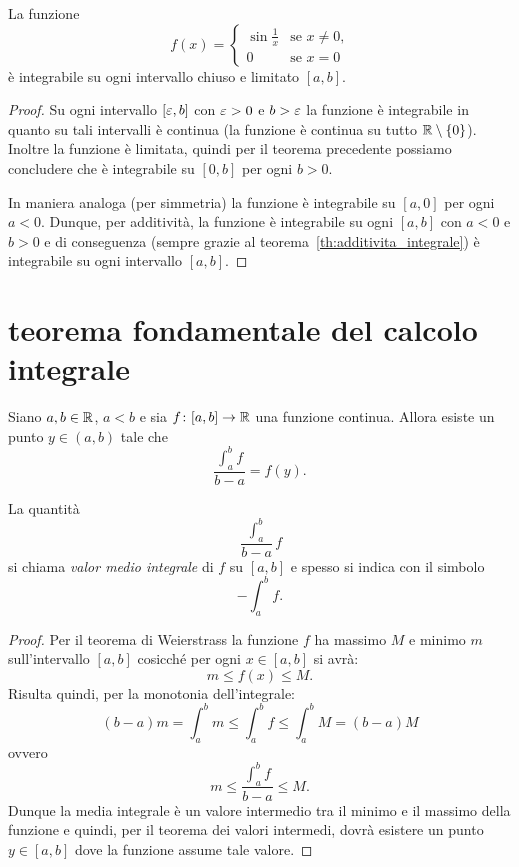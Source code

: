 \begin{example}
La funzione
\[
  f(x) = \begin{cases}
  \sin\frac 1 x & \text{se $x\neq 0$,}\\
  0 & \text{se $x=0$}
  \end{cases}
\]
è integrabile su ogni intervallo chiuso e limitato $[a,b]$.
\end{example}
\begin{proof}
Su ogni intervallo $[\varepsilon,b]$ con $\varepsilon>0$ e $b>\varepsilon$ la funzione
è integrabile in quanto su tali intervalli è continua (la funzione è continua su
tutto $\mathbb R\setminus{\left\{ 0 \right\}}$). Inoltre la funzione è limitata, quindi per il teorema
precedente possiamo concludere che è integrabile su $[0,b]$ per ogni $b>0$.

In maniera analoga (per simmetria) la funzione è integrabile su $[a,0]$
per ogni $a<0$.
Dunque, per additività, la funzione è integrabile su ogni $[a,b]$ con $a<0$ e $b>0$
e di conseguenza (sempre grazie al teorema~\ref{th:additivita_integrale})
è integrabile su ogni intervallo $[a,b]$.
\end{proof}

\section{teorema fondamentale del calcolo integrale}

\begin{theorem}
\mymark{***}
Siano $a,b\in \mathbb R$, $a<b$ e sia
$f\colon [a,b] \to \mathbb R$ una funzione continua.
Allora esiste un punto $y \in (a,b)$
tale che
\[
\frac{\int_a^b f}{b-a} = f(y).
\]
\end{theorem}
%
La quantità
\[
  \frac{\int_a^b}{b-a} f
\]
si chiama \emph{valor medio integrale} di $f$ su $[a,b]$ e spesso
si indica con il simbolo
\[
  -\!\!\!\!\!\!\int_a^b f.
\]
%
\begin{proof}
\mymark{***}
Per il teorema di Weierstrass la funzione $f$ ha massimo $M$ e minimo $m$
sull'intervallo $[a,b]$ cosicché
per ogni $x\in [a,b]$ si avrà:
\[
  m \le f(x) \le M.
\]
Risulta quindi, per la monotonia dell'integrale:
\[
  (b-a) m = \int_a^b m \le \int_a^b f \le \int_a^b M = (b-a) M
\]
ovvero
\[
  m \le \frac{\int_a^b f}{b-a} \le M.
\]
Dunque la media integrale è un valore intermedio tra il minimo e il massimo
della funzione e quindi, per il teorema dei valori intermedi,
dovrà esistere un punto $y\in [a,b]$ dove la funzione assume tale valore.
\end{proof}


